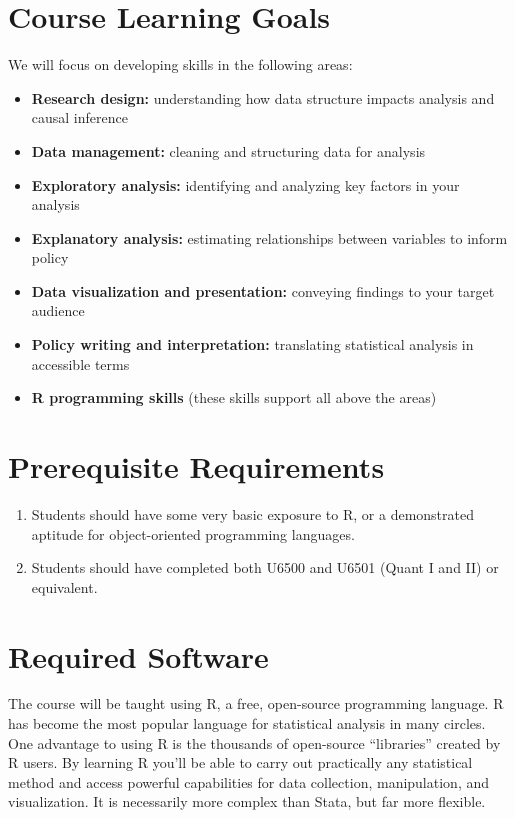 \documentclass[11pt,]{article}
\begin{document}
\hypertarget{course-learning-goals}{%
\section{Course Learning Goals}\label{course-learning-goals}}

We will focus on developing skills in the following areas:

\begin{itemize}
\item
  \textbf{Research design:} understanding how data structure impacts
  analysis and causal inference
\item
  \textbf{Data management:} cleaning and structuring data for analysis
\item
  \textbf{Exploratory analysis:} identifying and analyzing key factors
  in your analysis
\item
  \textbf{Explanatory analysis:} estimating relationships between
  variables to inform policy
\item
  \textbf{Data visualization and presentation:} conveying findings to
  your target audience
\item
  \textbf{Policy writing and interpretation:} translating statistical
  analysis in accessible terms
\item
  \textbf{R programming skills} (these skills support all above the
  areas)
\end{itemize}

\hypertarget{prerequisite-requirements}{%
\section{Prerequisite Requirements}\label{prerequisite-requirements}}

\begin{enumerate}
\def\labelenumi{\arabic{enumi}.}
\item
  Students should have some very basic exposure to R, or a demonstrated
  aptitude for object-oriented programming languages.
\item
  Students should have completed both U6500 and U6501 (Quant I and II)
  or equivalent.
\end{enumerate}

\hypertarget{required-software}{%
\section{Required Software}\label{required-software}}

The course will be taught using R, a free, open-source programming
language. R has become the most popular language for statistical
analysis in many circles. One advantage to using R is the thousands of
open-source ``libraries'' created by R users. By learning R you'll be
able to carry out practically any statistical method and access powerful
capabilities for data collection, manipulation, and visualization. It is
necessarily more complex than Stata, but far more flexible.
\end{document}
